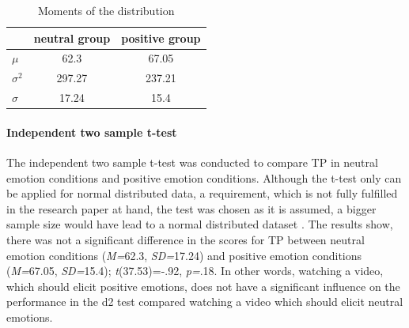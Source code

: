 \documentclass[	
	12pt, %
	a4paper, %
  abstracton
]{scrartcl}\usepackage[]{graphicx}\usepackage[]{color}
\begin{document}
\begin{table}[htb]
\centering
\begin{tabular}{lcc}
\hline
  & neutral group & positive group\\ 
\hline 
\(\mu\) & 62.3 & 67.05 \\ 
\(\sigma^{2}\) & 297.27 & 237.21 \\ 
\(\sigma\) & 17.24 & 15.4 \\ 
\hline 
\end{tabular} 
\caption{Moments of the distribution}
\label{moments_dist}
\end{table}

















\paragraph{Independent two sample t-test}
\label{wilcoxon}
The independent two sample t-test was conducted to compare TP in neutral emotion conditions and positive emotion conditions. Although the t-test only can be applied for normal distributed data, a requirement, which is not fully fulfilled in the research paper at hand, the test was chosen as it is assumed, a bigger sample size would have lead to a normal distributed dataset \cite{Dalgaard2008}. The results show, there was not a significant difference in the scores for TP between neutral emotion conditions (\textit{M=}62.3, \textit{SD=}17.24) and positive emotion conditions (\textit{M=}67.05, \textit{SD=}15.4); \textit{t}(37.53)=-.92, \textit{p=}.18. In other words, watching a video, which should elicit positive emotions, does not have a significant influence on the performance in the d2 test compared watching a video which should elicit neutral emotions.


\end{document}
